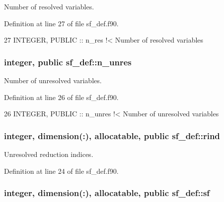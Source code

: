 Number of resolved variables. 



Definition at line 27 of file sf\+\_\+def.\+f90.


\begin{DoxyCode}
27   \textcolor{keywordtype}{INTEGER}, \textcolor{keywordtype}{PUBLIC} :: n\_res\textcolor{comment}{ !< Number of resolved variables}
\end{DoxyCode}
\subsubsection[{\texorpdfstring{n\+\_\+unres}{n_unres}}]{\setlength{\rightskip}{0pt plus 5cm}integer, public sf\+\_\+def\+::n\+\_\+unres}\hypertarget{namespacesf__def_a1e03f6f31a13f2bfa8e84dd69874b8aa}{}\label{namespacesf__def_a1e03f6f31a13f2bfa8e84dd69874b8aa}


Number of unresolved variables. 



Definition at line 26 of file sf\+\_\+def.\+f90.


\begin{DoxyCode}
26   \textcolor{keywordtype}{INTEGER}, \textcolor{keywordtype}{PUBLIC} :: n\_unres\textcolor{comment}{ !< Number of unresolved variables}
\end{DoxyCode}
\subsubsection[{\texorpdfstring{rind}{rind}}]{\setlength{\rightskip}{0pt plus 5cm}integer, dimension(\+:), allocatable, public sf\+\_\+def\+::rind}\hypertarget{namespacesf__def_a2befe00671a3add2d8049605682bcd52}{}\label{namespacesf__def_a2befe00671a3add2d8049605682bcd52}


Unresolved reduction indices. 



Definition at line 24 of file sf\+\_\+def.\+f90.

\subsubsection[{\texorpdfstring{sf}{sf}}]{\setlength{\rightskip}{0pt plus 5cm}integer, dimension(\+:), allocatable, public sf\+\_\+def\+::sf}\hypertarget{namespacesf__def_ad000452ff3b9c4c5ce070c04d0521b52}{}\label{namespacesf__def_ad000452ff3b9c4c5ce070c04d0521b52}


